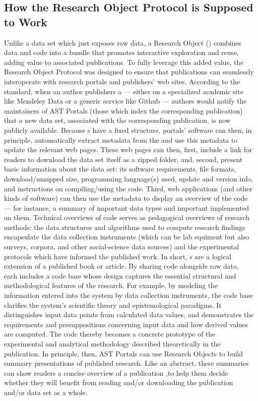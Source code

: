 \documentclass[10pt,letterpaper]{article}
\begin{document}
\subsection{How the Research Object Protocol is Supposed to Work}
Unlike a data set which just exposes raw data, a 
Research Object ({\RO}) combines data and code into a bundle 
that promotes interactive exploration and reuse, 
adding value to associated publications.  
To fully leverage this added value, the Research Object 
Protocol was designed to ensure that {\RO} 
publications can seamlessly interoperate 
with research portals and publishers' web sites.
\p{}
According to the standard, when an author publishers a 
{\RO} --- either on a specialized academic 
site like Mendeley Data or a generic service like 
Github --- authors would notify the maintainers of 
AST Portals (those which index the corresponding publication) 
that a new data set, associated with the corresponding 
publication, is now publicly available.  Because 
{\RO}s have a fixed structure, portals' 
software can then, in principle, automatically 
extract metadata from the {\RO} and 
use this metadata to update the relevant web pages. 
\p{} 
These web pages can 
then, first, include a link for readers to 
download the data set itself as a zipped folder, 
and, second, present basic information about 
the data set: its software requirements, 
file formats, download/unzipped size, programming 
language(s) used, update and version info, and 
instructions on compiling/using the 
{\RO} code.  Third, 
web applications (and other kinds of software) can then use 
the {\RO} metadata to display an overview of 
the {\RO} code --- for instance, a summary of 
important data types and important implemented on them.  
Technical overviews of {\RO} code 
serves as pedagogical overviews of research 
methods: the data structures and algorithms used to compute 
research findings encapsulate the data collection 
instruments (which can be lab equiment but also surveys, 
corpora, and other social-science data sources) 
and the experimental protocols which have informed 
the published work.
\p{} 
In short, {\RO}s are a logical extension of a 
published book or article.  By sharing code alongside raw 
data, each {\RO} includes a code base whose 
design captures the essential structural and methodological 
features of the research.  For example, by 
modeling the information entered into the system by 
data collection instruments, the {\RO} 
code base clarifies the system's scientific theory and 
epistemological paradigms.  It distinguishes 
input data points from calculated data values, and 
demonstrates the requirements and presuppositions 
concerning input data and how derived values 
are computed.  The 
{\RO} code thereby becomes a concrete 
prototype of the experimental and analytical 
methodology described theoretically in the publication.
\p{}
In principle, then, AST  
Portals can use Research Objects to build summary 
presentations of published research.  Like an 
abstract, these summaries can show readers a 
concise overview of a publication ,to help them 
decide whether they will benefit from reading and/or 
downloading the publication and/or data set as a whole.
\p{}
\end{document}

